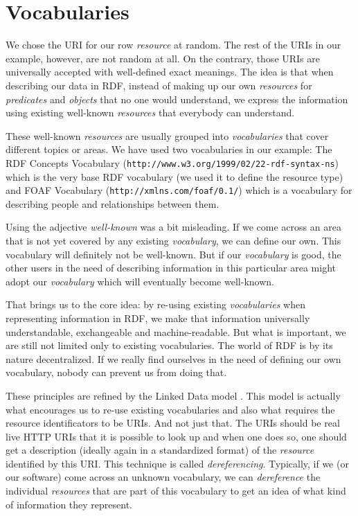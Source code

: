 \section{Vocabularies}

We chose the URI for our row \emph{resource} at random. The rest of the URIs in our example, however, are not random at all. On the contrary, those URIs are universally accepted with well-defined exact meanings. The idea is that when describing our data in RDF, instead of making up our own \emph{resources} for \emph{predicates} and \emph{objects} that no one would understand, we express the information using existing well-known \emph{resources} that everybody can understand.

These well-known \emph{resources} are usually grouped into \emph{vocabularies} that cover different topics or areas. We have used two vocabularies in our example: The RDF Concepts Vocabulary (\texttt{http://www.w3.org/1999/02/22-rdf-syntax-ns}) \cite{rdf_vocab} which is the very base RDF vocabulary (we used it to define the resource type) and FOAF Vocabulary (\texttt{http://xmlns.com/foaf/0.1/}) \cite{foaf_vocab} which is a vocabulary for describing people and relationships between them.

Using the adjective \emph{well-known} was a bit misleading. If we come across an area that is not yet covered by any existing \emph{vocabulary}, we can define our own. This vocabulary will definitely not be well-known. But if our \emph{vocabulary} is good, the other users in the need of describing information in this particular area might adopt our \emph{vocabulary} which will eventually become well-known.

That brings us to the core idea: by re-using existing \emph{vocabularies} when representing information in RDF, we make that information universally understandable, exchangeable and machine-readable. But what is important, we are still not limited only to existing vocabularies. The world of RDF is by its nature decentralized. If we really find ourselves in the need of defining our own vocabulary, nobody can prevent us from doing that.

These principles are refined by the Linked Data model \cite{ld}. This model is actually what encourages us to re-use existing vocabularies and also what requires the resource identificators to be URIs. And not just that. The URIs should be real live HTTP URIs that it is possible to look up and when one does so, one should get a description (ideally again in a standardized format) of the \emph{resource} identified by this URI. This technique is called \emph{dereferencing}. Typically, if we (or our software) come across an unknown vocabulary, we can \emph{dereference} the individual \emph{resources} that are part of this vocabulary to get an idea of what kind of information they represent.

